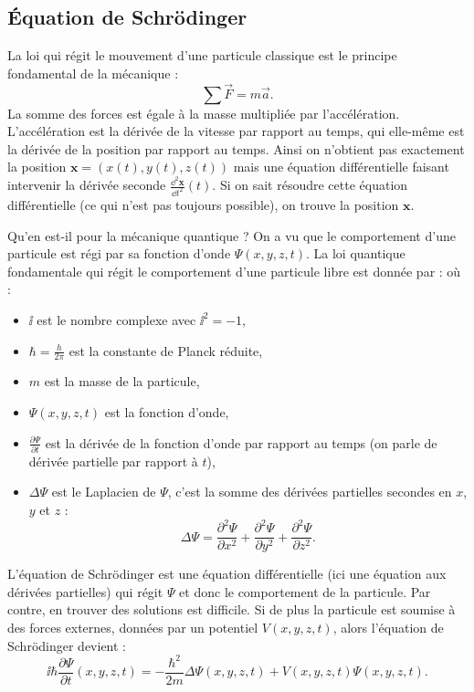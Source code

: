 \documentclass[11pt,class=report,crop=false]{standalone}
\begin{document}


\subsection{Équation de Schrödinger}

La loi qui régit le mouvement d'une particule classique est le principe fondamental de la mécanique :
$$\sum \vec F = m \vec a.$$
La somme des forces est égale à la masse multipliée par l'accélération.
L'accélération est la dérivée de la vitesse par rapport au temps, qui elle-même est la dérivée de la position par rapport au temps.
Ainsi on n'obtient pas exactement la position $\mathbf{x} = (x(t),y(t),z(t))$  mais une équation différentielle faisant intervenir la dérivée seconde $\frac{\dd^2 \mathbf x}{\dd t^2}(t)$. Si on sait résoudre cette équation différentielle (ce qui n'est pas toujours possible), on trouve la position $\mathbf{x}$.

\bigskip

Qu'en est-il pour la mécanique quantique ?
On a vu que le comportement d'une particule est régi par sa fonction d'onde $\Psi(x,y,z,t)$.
La loi quantique fondamentale qui régit le comportement d'une particule libre est donnée par  :
où :
\begin{itemize}
  \item $\ii$ est le nombre complexe avec $\ii^2 = -1$,
  \item $\hbar = \frac{h}{2\pi}$ est la constante de Planck réduite,
  \item $m$ est la masse de la particule,
  \item $\Psi(x,y,z,t)$ est la fonction d'onde,
  \item $\frac{\partial \Psi}{\partial t}$ est la dérivée de la fonction d'onde par rapport au temps (on parle de dérivée partielle par rapport à $t$),
  \item $\Delta \Psi$ est le Laplacien de $\Psi$, c'est la somme des dérivées partielles secondes en $x$, $y$ et $z$ :
$$\Delta \Psi = \frac{\partial^2 \Psi}{\partial x^2} + \frac{\partial^2 \Psi}{\partial y^2} + \frac{\partial^2 \Psi}{\partial z^2}.$$
\end{itemize}

L'équation de Schrödinger est une équation différentielle (ici une équation aux dérivées partielles) qui régit $\Psi$ et donc le comportement de la particule. Par contre, en trouver des solutions est difficile.
Si de plus la particule est soumise à des forces externes, données par un potentiel $V(x,y,z,t)$, alors l'équation de Schrödinger devient :
$$\ii \hbar \frac{\partial \Psi}{\partial t}(x,y,z,t) = - \frac{\hbar^2}{2m} \Delta \Psi(x,y,z,t) + V(x,y,z,t)\Psi(x,y,z,t).$$
\end{document}

